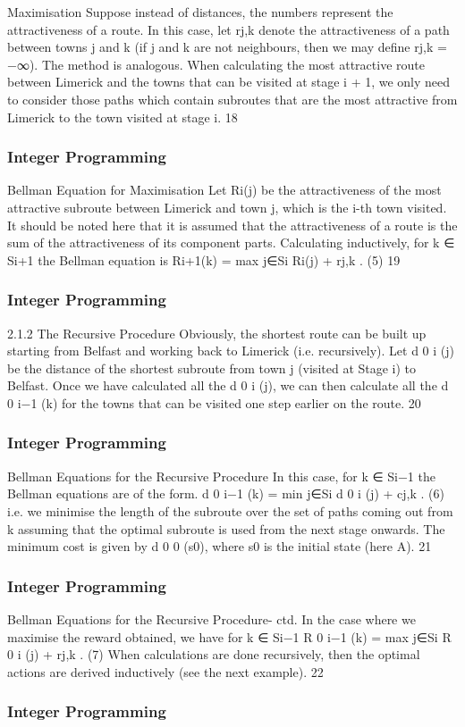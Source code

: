 \begin{frame}
Maximisation
Suppose instead of distances, the numbers represent the
attractiveness of a route.
In this case, let rj,k denote the attractiveness of a path between
towns j and k (if j and k are not neighbours, then we may define
rj,k = −∞).
The method is analogous. When calculating the most attractive
route between Limerick and the towns that can be visited at stage
i + 1, we only need to consider those paths which contain
subroutes that are the most attractive from Limerick to the town
visited at stage i.
18 \end{frame}  \begin{frame} \frametitle{Integer Programming}     
Bellman Equation for Maximisation
Let Ri(j) be the attractiveness of the most attractive subroute
between Limerick and town j, which is the i-th town visited.
It should be noted here that it is assumed that the attractiveness
of a route is the sum of the attractiveness of its component parts.
Calculating inductively, for k ∈ Si+1 the Bellman equation is
Ri+1(k) = max
j∈Si
{Ri(j) + rj,k }. (5)
19 \end{frame}  \begin{frame} \frametitle{Integer Programming}     
2.1.2 The Recursive Procedure
Obviously, the shortest route can be built up starting from Belfast
and working back to Limerick (i.e. recursively).
Let d
0
i
(j) be the distance of the shortest subroute from town j
(visited at Stage i) to Belfast.
Once we have calculated all the d
0
i
(j), we can then calculate all the
d
0
i−1
(k) for the towns that can be visited one step earlier on the
route.
20 \end{frame}  \begin{frame} \frametitle{Integer Programming}     
Bellman Equations for the Recursive Procedure
In this case, for k ∈ Si−1 the Bellman equations are of the form.
d
0
i−1
(k) = min
j∈Si
{d
0
i
(j) + cj,k }. (6)
i.e. we minimise the length of the subroute over the set of paths
coming out from k assuming that the optimal subroute is used
from the next stage onwards. The minimum cost is given by
d
0
0
(s0), where s0 is the initial state (here A).
21 \end{frame}  \begin{frame} \frametitle{Integer Programming}     
Bellman Equations for the Recursive Procedure- ctd.
In the case where we maximise the reward obtained, we have for
k ∈ Si−1
R
0
i−1
(k) = max
j∈Si
{R
0
i
(j) + rj,k }. (7)
When calculations are done recursively, then the optimal actions
are derived inductively (see the next example).
22 \end{frame}  \begin{frame} \frametitle{Integer Programming}     

\end{frame}
